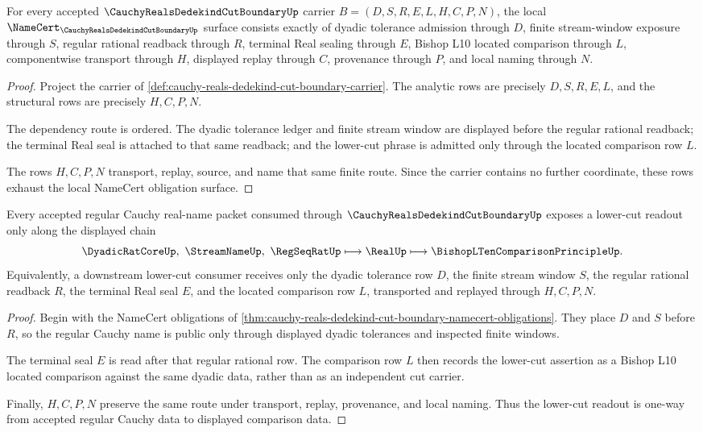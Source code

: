 \begin{theorem}
\label{thm:cauchy-reals-dedekind-cut-boundary-namecert-obligations}
For every accepted $\CauchyRealsDedekindCutBoundaryUp$ carrier $B=(D,S,R,E,L,H,C,P,N)$, the local $\NameCert_{\CauchyRealsDedekindCutBoundaryUp}$ surface consists exactly of dyadic tolerance admission through $D$, finite stream-window exposure through $S$, regular rational readback through $R$, terminal Real sealing through $E$, Bishop L10 located comparison through $L$, componentwise transport through $H$, displayed replay through $C$, provenance through $P$, and local naming through $N$.
\end{theorem}
\begin{proof}
Project the carrier of \autoref{def:cauchy-reals-dedekind-cut-boundary-carrier}. The analytic rows are precisely $D,S,R,E,L$, and the structural rows are precisely $H,C,P,N$.

The dependency route is ordered. The dyadic tolerance ledger and finite stream window are displayed before the regular rational readback; the terminal Real seal is attached to that same readback; and the lower-cut phrase is admitted only through the located comparison row $L$.

The rows $H,C,P,N$ transport, replay, source, and name that same finite route. Since the carrier contains no further coordinate, these rows exhaust the local NameCert obligation surface.
\end{proof}

\begin{theorem}
\label{thm:cauchy-reals-dedekind-cut-boundary-one-way-route}
Every accepted regular Cauchy real-name packet consumed through $\CauchyRealsDedekindCutBoundaryUp$ exposes a lower-cut readout only along the displayed chain
$$
\DyadicRatCoreUp,\ \StreamNameUp,\ \RegSeqRatUp \longmapsto \RealUp \longmapsto \BishopLTenComparisonPrincipleUp .
$$
Equivalently, a downstream lower-cut consumer receives only the dyadic tolerance row $D$, the finite stream window $S$, the regular rational readback $R$, the terminal Real seal $E$, and the located comparison row $L$, transported and replayed through $H,C,P,N$.
\end{theorem}
\begin{proof}
Begin with the NameCert obligations of \autoref{thm:cauchy-reals-dedekind-cut-boundary-namecert-obligations}. They place $D$ and $S$ before $R$, so the regular Cauchy name is public only through displayed dyadic tolerances and inspected finite windows.

The terminal seal $E$ is read after that regular rational row. The comparison row $L$ then records the lower-cut assertion as a Bishop L10 located comparison against the same dyadic data, rather than as an independent cut carrier.

Finally, $H,C,P,N$ preserve the same route under transport, replay, provenance, and local naming. Thus the lower-cut readout is one-way from accepted regular Cauchy data to displayed comparison data.
\end{proof}

